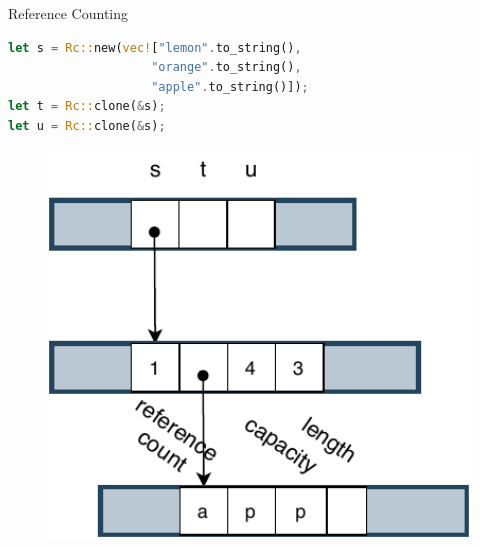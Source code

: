 \documentclass[9pt]{beamer}
\begin{document}

\begin{frame}[fragile]{Reference Counting}
    
\vspace{-0.5cm}
\begin{minipage}{0.7\linewidth}
\begin{lstlisting}[language=Rust]
let s = Rc::new(vec!["lemon".to_string(), 
                    "orange".to_string(), 
                    "apple".to_string()]);
let t = Rc::clone(&s);
let u = Rc::clone(&s); 
\end{lstlisting}
\end{minipage}     

    \begin{minipage}{0.3\linewidth}
        \begin{figure}[hp]
            \centering
            \begin{center}
                    \includegraphics[width=1.0\textwidth]{images/rc1.pdf}
                    \captionsetup{labelformat=empty}
            \end{center}
            

\end{figure}
\end{minipage}
\end{frame}
\end{document}
